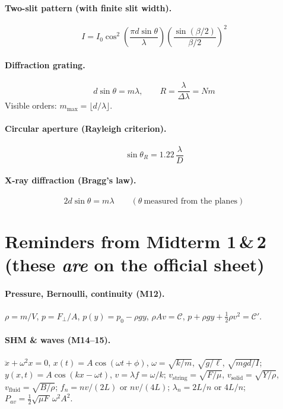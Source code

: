 \documentclass[11pt]{article}
\begin{document}
\paragraph{Two-slit pattern (with finite slit width).}
\[
I = I_0\cos^2\!\left(\frac{\pi d\sin\theta}{\lambda}\right)
\!\left(\frac{\sin(\beta/2)}{\beta/2}\right)^{\!2}
\]

\paragraph{Diffraction grating.}
\[
d\sin\theta = m\lambda,\qquad
R = \frac{\lambda}{\Delta\lambda} = N m
\]
Visible orders: $m_{\max} = \lfloor d/\lambda\rfloor$.

\paragraph{Circular aperture (Rayleigh criterion).}
\[
\sin\theta_R = 1.22\,\frac{\lambda}{D}
\]

\paragraph{X-ray diffraction (Bragg's law).}
\[
2d\sin\theta = m\lambda \qquad(\theta\ \text{measured from the planes})
\]

\section*{Reminders from Midterm 1\,\&\,2 (these \emph{are} on the official sheet)}

\paragraph{Pressure, Bernoulli, continuity (M12).}
$\rho = m/V$,
$p = F_\perp/A$,
$p(y) = p_0 - \rho g y$,
$\rho A v = \mathcal{C}$,
$p + \rho g y + \tfrac{1}{2}\rho v^2 = \mathcal{C}'$.

\paragraph{SHM \& waves (M14--15).}
$\ddot x + \omega^2 x = 0$,
$x(t) = A\cos(\omega t + \phi)$,
$\omega = \sqrt{k/m}$, $\sqrt{g/\ell}$, $\sqrt{mgd/I}$;
$y(x,t) = A\cos(kx - \omega t)$, $v = \lambda f = \omega/k$;
$v_{\text{string}}=\sqrt{F/\mu}$, $v_{\text{solid}}=\sqrt{Y/\rho}$, $v_{\text{fluid}}=\sqrt{B/\rho}$;
$f_n = nv/(2L)$ or $nv/(4L)$;
$\lambda_n = 2L/n$ or $4L/n$;
$P_{av} = \tfrac{1}{2}\sqrt{\mu F}\,\omega^2 A^2$.
\end{document}
